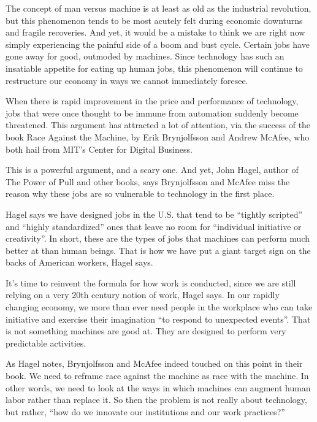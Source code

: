 The concept of man versus machine is at least as old as the industrial revolution, but this phenomenon tends to be most acutely felt during economic downturns and fragile recoveries. And yet, it would be a mistake to think we are right now simply experiencing the painful side of a boom and bust cycle. Certain jobs have gone away for good, outmoded by machines. Since technology has such  an insatiable appetite for eating up human jobs, this phenomenon will continue to restructure our economy in ways we cannot immediately foresee.


When there is rapid improvement in the price and performance of technology, jobs that were once thought to be immune from automation suddenly become threatened. This argument has attracted a lot of attention, via the success of the  book Race Against the Machine, by Erik Brynjolfsson and Andrew McAfee, who both hail from MIT's Center for Digital Business.


This is a powerful argument, and a scary one. And yet, John Hagel, author of The Power of Pull and other books, says Brynjolfsson and McAfee miss the reason why these jobs are so vulnerable to technology in the first place.


Hagel says we have designed jobs in the U.S. that tend to be ``tightly scripted'' and ``highly standardized'' ones that leave no room for ``individual initiative or creativity''. In short, these are the types of jobs that machines can perform much better at than human beings. That is how we have put a giant target sign on the  backs of American workers, Hagel says.


It's time to reinvent the formula for how work is conducted, since we are still relying on a very 20th century notion of work, Hagel says. In our rapidly changing economy, we more than ever need people in the workplace who can take initiative and exercise their imagination ``to respond to unexpected events''. That is not something machines are good at. They are designed to perform very predictable activities.


As Hagel notes, Brynjolfsson and McAfee indeed touched on this point in their book. We need to reframe race against the machine as race with the machine.  In other words, we need to look at the ways in which machines can augment human labor rather than replace it. So then the problem is not really about technology, but rather, ``how do we innovate our institutions and our work practices?''